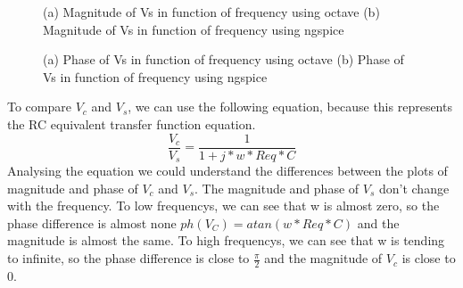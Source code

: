 \newpage

\begin{figure}[h!]
            \centering
            \caption{(a) Magnitude of Vs in function of frequency using octave (b) Magnitude of Vs in function of frequency using ngspice}
            \label{fig:icefe}
\end{figure}
\begin{figure}[h!]
            \centering
            \caption{(a) Phase of Vs in function of frequency using octave (b) Phase of Vs in function of frequency using ngspice}
            \label{fig:icrgce}
\end{figure}


\newpage
To compare $V_c$ and $V_s$, we can use the following equation, because this represents the RC equivalent transfer function equation.
$$\frac{V_c}{V_s}=\frac{1}{1+j*w*Req*C}$$
Analysing the equation we could understand the differences between the plots of magnitude and phase of $V_c$ and $V_s$.
The magnitude and phase of $V_s$ don't change with the frequency.
To low frequencys, we can see that w is almost zero, so the phase difference is almost none $ph(V_C) = atan(w*Req*C)$ and the magnitude is almost the same.
To high frequencys, we can see that w is tending to infinite, so the phase difference is close to $\frac{\pi}{2}$ and the magnitude of $V_c$ is close to 0. 

